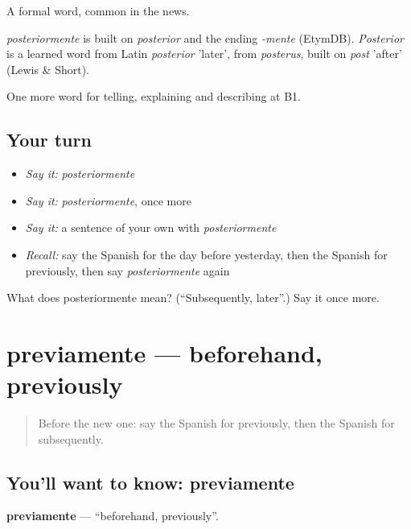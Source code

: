 A formal word, common in the news.

\begin{cousinweb}
\emph{posteriormente} is built on \emph{posterior} and the ending \emph{-mente} (EtymDB). \emph{Posterior} is a learned word from Latin \emph{posterior} 'later', from \emph{posterus}, built on \emph{post} 'after' (Lewis \& Short).
\end{cousinweb}

\begin{grammarlens}[title={What you've built}]
One more word for telling, explaining and describing at B1.
\end{grammarlens}

\subsection*{Your turn}
\begin{itemize}
\raggedright
  \item \emph{Say it:} \emph{posteriormente}
  \item \emph{Say it:} \emph{posteriormente}, once more
  \item \emph{Say it:} a sentence of your own with \emph{posteriormente}
  \item \emph{Recall:} say the Spanish for the day before yesterday, then the Spanish for previously, then say \emph{posteriormente} again
\end{itemize}

\begin{tcolorbox}[breakable,colback=teal!4,colframe=teal!35!black,title={Before you move on}]
What does posteriormente mean? (\textquotedblleft{}Subsequently, later\textquotedblright{}.) Say it once more.
\end{tcolorbox}
\section[previamente]{previamente — beforehand, previously}

\label{lesson:ES-C538-previamente}



\begin{quote}
Before the new one: say the Spanish for previously, then the Spanish for subsequently.
\end{quote}

\subsection*{You'll want to know: previamente}
\textbf{previamente} — \textquotedblleft{}beforehand, previously\textquotedblright{}.

